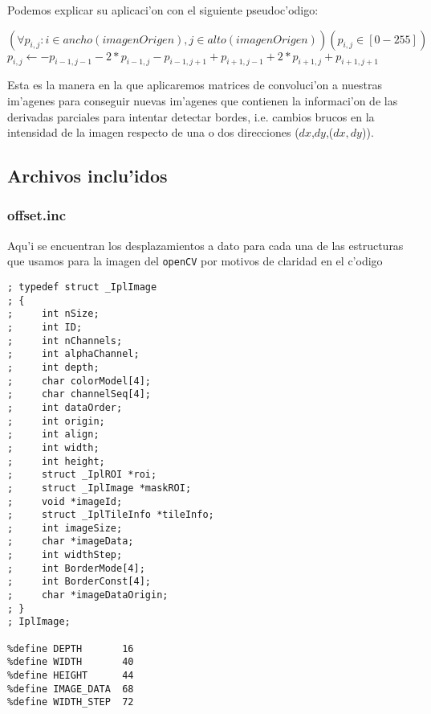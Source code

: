 \documentclass[11pt]{article}
\begin{document}
Podemos explicar su aplicaci'on con el siguiente pseudoc'odigo:

 \begin{algorithmic}[1]
\STATE $(\forall p_{i,j} : i \in ancho(imagenOrigen), j \in alto(imagenOrigen))(p_{i,j} \in [0-255])$
\STATE $p_{i,j} \leftarrow -p_{i-1,j-1} - 2 * p_{i-1,j} - p_{i-1,j+1} +p_{i+1,j-1} + 2 * p_{i+1,j} + p_{i+1,j+1}$\label{lin:linea_asignapixel}
\ENDFOR
\ENDFOR
 \end{algorithmic}

Esta es la manera en la que aplicaremos matrices de convoluci'on a nuestras im'agenes para conseguir nuevas im'agenes que contienen la informaci'on de las derivadas parciales para intentar detectar bordes, i.e. cambios brucos en la intensidad de la imagen respecto de una o dos direcciones ($dx$,$dy$,($dx,dy$)).

\subsection{Archivos inclu'idos}
\subsubsection{offset.inc}
Aqu'i se encuentran los desplazamientos a dato para cada una de las estructuras que usamos para la imagen del \verb-openCV- por motivos de claridad en el c'odigo
\begin{lstlisting}[frame=single]
; typedef struct _IplImage
; {
;     int nSize;
;     int ID;
;     int nChannels;
;     int alphaChannel;
;     int depth;
;     char colorModel[4];
;     char channelSeq[4];
;     int dataOrder;
;     int origin;
;     int align;
;     int width;
;     int height;
;     struct _IplROI *roi;
;     struct _IplImage *maskROI;
;     void *imageId;
;     struct _IplTileInfo *tileInfo;
;     int imageSize;
;     char *imageData;
;     int widthStep;
;     int BorderMode[4];
;     int BorderConst[4];
;     char *imageDataOrigin;
; }
; IplImage;

%define DEPTH		16
%define WIDTH		40
%define HEIGHT		44
%define IMAGE_DATA 	68
%define WIDTH_STEP	72
\end{lstlisting}
\end{document}
